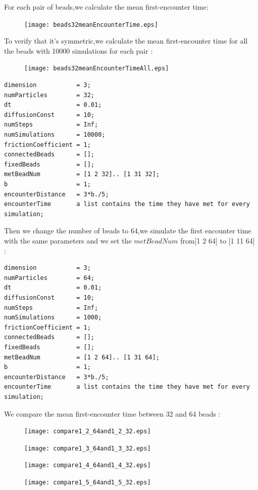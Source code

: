 \documentclass{article}
\begin{document}
For each pair of beads,we calculate the mean first-encounter time:
\begin{figure}[H]
\centering
\texttt{[image: beads32meanEncounterTime.eps]}
\end{figure}
\pagebreak
To verify that it's symmetric,we calculate the mean first-encounter time for all the beads with 10000 simulations for each pair :\\
\begin{figure}[H]
\texttt{[image: beads32meanEncounterTimeAll.eps]}
\end{figure}
\begin{lstlisting}
dimension           = 3;
numParticles        = 32;
dt                  = 0.01;
diffusionConst      = 10;
numSteps            = Inf;
numSimulations      = 10000;
frictionCoefficient = 1;
connectedBeads      = [];
fixedBeads          = [];
metBeadNum          = [1 2 32].. [1 31 32];
b                   = 1;
encounterDistance   = 3*b./5;
encounterTime       a list contains the time they have met for every simulation;      
\end{lstlisting}
\pagebreak
Then we change the number of beads to 64,we simulate the first encounter time with the same parameters and we set the $metBeadNum$ from[1 2 64] to [1 11 64] :\\
\begin{lstlisting}
dimension           = 3;
numParticles        = 64;
dt                  = 0.01;
diffusionConst      = 10;
numSteps            = Inf;
numSimulations      = 1000;
frictionCoefficient = 1;
connectedBeads      = [];
fixedBeads          = [];
metBeadNum          = [1 2 64].. [1 31 64];
b                   = 1;
encounterDistance   = 3*b./5;
encounterTime       a list contains the time they have met for every simulation;      
\end{lstlisting}
We compare the mean first-encounter time between 32 and 64 beads :\\
	\begin{figure}[H]
		\begin{minipage}[t]{0.5\textwidth}
			\centering
			\texttt{[image: compare1\_2\_64and1\_2\_32.eps]}
			
		\end{minipage}%
		\begin{minipage}[t]{1.0\textwidth}
			\centering
			\texttt{[image: compare1\_3\_64and1\_3\_32.eps]}
			
		\end{minipage}
	\end{figure}
	\begin{figure}[H]
		\begin{minipage}[t]{0.5\textwidth}
			\centering
			\texttt{[image: compare1\_4\_64and1\_4\_32.eps]}
			
		\end{minipage}%
		\begin{minipage}[t]{1.0\textwidth}
			\centering
			\texttt{[image: compare1\_5\_64and1\_5\_32.eps]}
		
		\end{minipage}
	\end{figure}	
\end{document}
